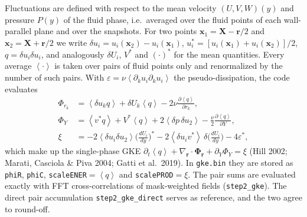 \documentclass[11pt,a4paper]{article}
\newcommand{\avg}[1]{\left\langle #1 \right\rangle}
\newcommand{\du}{\delta u}
\newcommand{\vect}[1]{\boldsymbol{#1}}
\begin{document}
Fluctuations are defined with respect to the mean velocity $(U,V,W)(y)$ and
pressure $P(y)$ of the fluid phase, i.e.\ averaged over the fluid points of
each wall-parallel plane and over the snapshots. For two points
$\vect x_1=\vect X-\vect r/2$ and $\vect x_2=\vect X+\vect r/2$ we write
$\du_i=u_i(\vect x_2)-u_i(\vect x_1)$, $u^*_i=[u_i(\vect x_1)+u_i(\vect x_2)]/2$,
$q=\du_i\du_i$, and analogously $\delta U_i$, $V^*$ and $(\cdot)^*$ for the
mean quantities. Every average $\avg{\cdot}$ is taken over pairs of fluid
points only and renormalized by the number of such pairs. With
$\varepsilon=\nu\avg{\partial_k u_i\partial_k u_i}$ the pseudo-dissipation,
the code evaluates
\begin{align}
  \Phi_{r_k}&=\avg{\du_k q}+\delta U_k\avg{q}-2\nu\frac{\partial\avg{q}}{\partial r_k},
  \label{eq:phir}\\
  \Phi_Y&=\avg{v^*q}+V^*\avg{q}+2\avg{\delta p\,\du_2}-\frac{\nu}{2}\frac{\partial\avg{q}}{\partial Y},
  \label{eq:phic}\\
  \xi&=-2\avg{\du_i\du_2}\Big(\frac{dU_i}{dy}\Big)^*
       -2\avg{\du_i v^*}\,\delta\Big(\frac{dU_i}{dy}\Big)-4\varepsilon^*,
  \label{eq:xi}
\end{align}
which make up the single-phase GKE
$\partial_t\avg{q}+\nabla_{\vect r}\cdot\vect\Phi_{\vect r}+\partial_Y\Phi_Y=\xi$
(Hill 2002; Marati, Casciola \& Piva 2004; Gatti et al.\ 2019). In
\texttt{gke.bin} they are stored as \texttt{phiR}, \texttt{phiC},
\texttt{scaleENER}$=\avg{q}$ and \texttt{scalePROD}$=\xi$. The pair sums are
evaluated exactly with FFT cross-correlations of mask-weighted fields
(\texttt{step2\_gke}). The direct pair accumulation \texttt{step2\_gke\_direct}
serves as reference, and the two agree to round-off.
\end{document}
